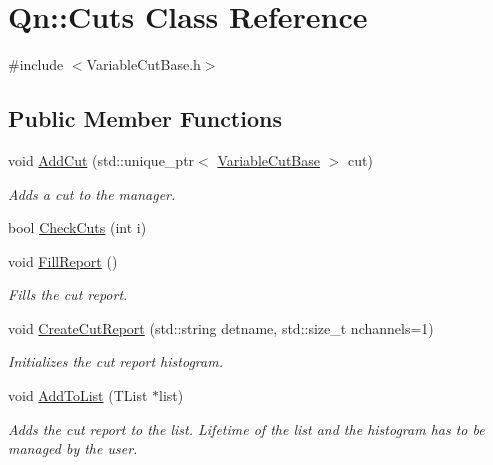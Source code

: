 \hypertarget{classQn_1_1Cuts}{}\section{Qn\+:\+:Cuts Class Reference}
\label{classQn_1_1Cuts}


{\ttfamily \#include $<$Variable\+Cut\+Base.\+h$>$}

\subsection*{Public Member Functions}
\begin{DoxyCompactItemize}
\item 
void \mbox{\hyperlink{classQn_1_1Cuts_aae5bfa081e4d3eec94422b3a8ae4213b}{Add\+Cut}} (std\+::unique\+\_\+ptr$<$ \mbox{\hyperlink{structQn_1_1VariableCutBase}{Variable\+Cut\+Base}} $>$ cut)
\begin{DoxyCompactList}\small\item\em Adds a cut to the manager. \end{DoxyCompactList}\item 
bool \mbox{\hyperlink{classQn_1_1Cuts_a9b010978523b569af5c1a40a6a03d898}{Check\+Cuts}} (int i)
\item 
\mbox{\label{classQn_1_1Cuts_a63d2b62a2a41013d6611f71a4294b914}} 
void \mbox{\hyperlink{classQn_1_1Cuts_a63d2b62a2a41013d6611f71a4294b914}{Fill\+Report}} ()
\begin{DoxyCompactList}\small\item\em Fills the cut report. \end{DoxyCompactList}\item 
void \mbox{\hyperlink{classQn_1_1Cuts_a4d53915785801bca58a9290149dca028}{Create\+Cut\+Report}} (std\+::string detname, std\+::size\+\_\+t nchannels=1)
\begin{DoxyCompactList}\small\item\em Initializes the cut report histogram. \end{DoxyCompactList}\item 
void \mbox{\hyperlink{classQn_1_1Cuts_ade6fa16364755bd88ed127ea8ef4cdb4}{Add\+To\+List}} (T\+List $\ast$list)
\begin{DoxyCompactList}\small\item\em Adds the cut report to the list. Lifetime of the list and the histogram has to be managed by the user. \end{DoxyCompactList}\end{DoxyCompactItemize}


